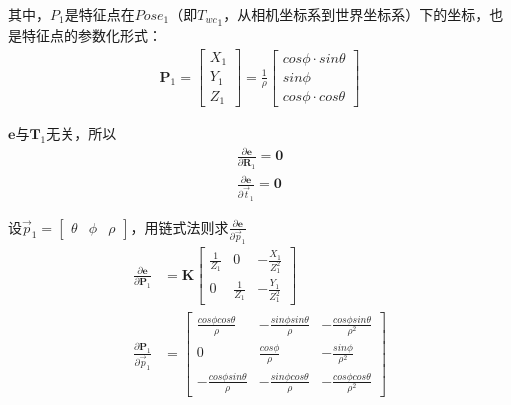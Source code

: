 \documentclass{article}
\begin{document}
其中，$P_1$是特征点在$Pose_1$（即${T_{wc}}_{1}$，从相机坐标系到世界坐标系）下的坐标，也是特征点的参数化形式：
\begin{equation}
	\begin{aligned}
		\boldsymbol{P}_1=       
		\left[                  
		\begin{matrix}          
		X_1                     \\ 
		Y_1                     \\
		Z_1                     
		\end{matrix}            
		\right]=\frac{1}{\rho}  
		\left[                  
		\begin{matrix}          
		cos\phi \cdot sin\theta \\
		sin\phi                 \\
		cos\phi \cdot cos\theta 
		\end{matrix}            
		\right]                 
	\end{aligned}
\end{equation}

$\boldsymbol{e}$与$\boldsymbol{T}_1$无关，所以
$$
\begin{aligned}
	\frac {\partial{\boldsymbol{e}}}{\partial{\boldsymbol{R}_1}}=\boldsymbol{0} \\
	\frac {\partial{\boldsymbol{e}}}{\partial{\vec{t}_1}}=\boldsymbol{0}
\end{aligned}
$$

设$\vec{p}_1=\left[\begin{matrix} \theta&\phi&\rho  \end{matrix}\right]$，用链式法则求$\frac{\partial{\boldsymbol{e}}}{\partial{\vec{p}_1}}$
\begin{equation}
	\begin{aligned}
		\frac {\partial{\boldsymbol{e}}}{\partial{\boldsymbol{P}_1}}&=\boldsymbol K 
		\left[
		\begin{matrix}
		\frac{1}{Z_1}                   & 0                               & -\frac{X_1}{Z_1^2}                \\
		0                               & \frac{1}{Z_1}                   & -\frac{Y_1}{Z_1^2}                
		\end{matrix}
		\right] \\ 
		\frac{\partial{\boldsymbol{P}_1}}{\partial{\vec{p}_1}}&=
		\left[
		\begin{matrix}
		\frac{cos\phi cos\theta}{\rho}  & -\frac{sin\phi sin\theta}{\rho} & -\frac{cos\phi sin\theta}{\rho^2} \\
		0                               & \frac{cos\phi}{\rho}            & -\frac{sin\phi}{\rho^2}           \\
		-\frac{cos\phi sin\theta}{\rho} & -\frac{sin\phi cos\theta}{\rho} & -\frac{cos\phi cos\theta}{\rho^2} 
		\end{matrix}
		\right]
	\end{aligned}
\end{equation}
\end{document}
